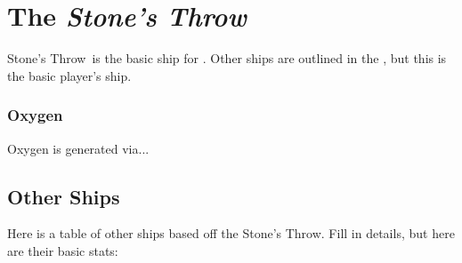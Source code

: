 \newcommand{\shipname}{Stone's Throw}

\section{The \textit{\shipname}}
\shipname\, is the basic ship for \getTitleShort . Other ships are outlined in the \shipBookTitle , but this is the basic player's ship.

\subsubsection{Oxygen}
Oxygen is generated via...

\subsection{Other Ships}
Here is a table of other ships based off the \shipname . Fill in details, but here are their basic stats:

